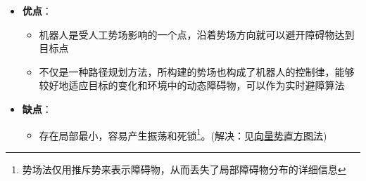 \documentclass[../main.tex]{subfiles}
\begin{document}
\begin{enumerate}
\begin{itemize}
            \item \textbf{优点}：
                \begin{itemize}
                    \item 机器人是受人工势场影响的一个点，沿着势场方向就可以避开障碍物达到目标点
                    \item 不仅是一种路径规划方法，所构建的势场也构成了机器人的控制律，能够较好地适应目标的变化和环境中的动态障碍物，可以作为实时避障算法
                \end{itemize}
            \item \textbf{缺点}：
                \begin{itemize}
                    \item 存在局部最小，容易产生振荡和死锁\footnote{势场法仅用推斥势来表示障碍物，从而丢失了局部障碍物分布的详细信息}。(解决：见\hyperref[xiangliang]{向量势直方图法})
                \end{itemize}
        \end{itemize}

    
\end{enumerate}
\end{document}
